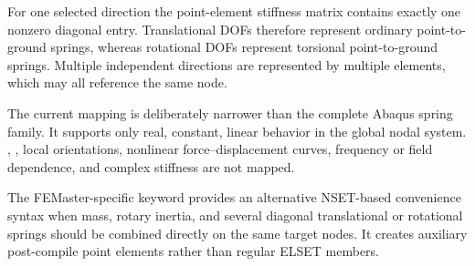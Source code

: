 For one selected direction the point-element stiffness matrix contains exactly one nonzero diagonal entry. Translational DOFs therefore represent ordinary point-to-ground springs, whereas rotational DOFs represent torsional point-to-ground springs. Multiple independent directions are represented by multiple  elements, which may all reference the same node.

The current mapping is deliberately narrower than the complete Abaqus spring family. It supports only real, constant, linear  behavior in the global nodal system. , , local orientations, nonlinear force--displacement curves, frequency or field dependence, and complex stiffness are not mapped.

The FEMaster-specific  keyword provides an alternative NSET-based convenience syntax when mass, rotary inertia, and several diagonal translational or rotational springs should be combined directly on the same target nodes. It creates auxiliary post-compile point elements rather than regular ELSET members.

